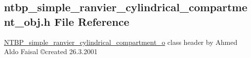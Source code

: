 \subsection{ntbp\_\-simple\_\-ranvier\_\-cylindrical\_\-compartment\_\-obj.h File Reference}
\label{ntbp__simple__ranvier__cylindrical__compartment__obj_8h}



\begin{DoxyItemize}
\item \hyperlink{class_n_t_b_p__simple__ranvier__cylindrical__compartment__o}{NTBP\_\-simple\_\-ranvier\_\-cylindrical\_\-compartment\_\-o} class header by Ahmed Aldo Faisal \copyright created 26.3.2001 
\end{DoxyItemize} 


